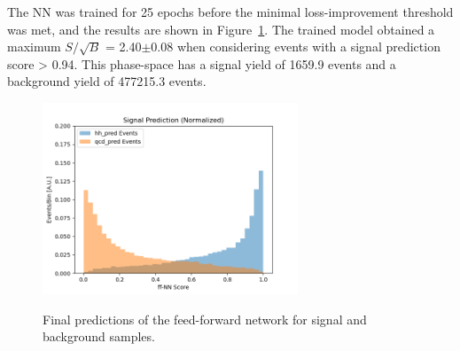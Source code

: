 The NN was trained for 25 epochs before the minimal loss-improvement threshold was met, and the results are shown in Figure~\ref{fig:results_nn}. The trained model obtained a maximum $S/\sqrt{B}$ = 2.40$\pm$0.08 when considering events with a signal prediction score > 0.94. This phase-space has a signal yield of 1659.9 events and a background yield of 477215.3 events.

\begin{figure}[!h] 
\begin{center}
   \includegraphics[width = 3in]{ffNN/figures/score_ffnn_v3}\\
\caption{Final predictions of the feed-forward network for signal and background samples.}
  \label{fig:results_nn}
\end{center}
\end{figure}

